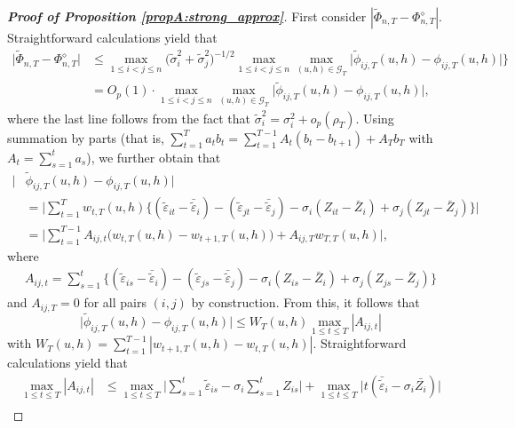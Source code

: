 \begin{proof}[\textnormal{\textbf{Proof of Proposition \ref{propA:strong_approx}}}]
First consider $|\widetilde{\Phi}_{n, T} - \Phi_{n, T}^{\diamond}|$. Straightforward calculations yield that 
\begin{align}
\big| \widetilde{\Phi}_{n, T} - \Phi_{n, T}^{\diamond} \big| 
 & \le \max_{1\le i < j \le n} \big(\widetilde{\sigma}_i^2 + \widetilde{\sigma}_j^2 \big)^{-1/2} \max_{1\le i < j \le n} \max_{(u,h) \in \mathcal{G}_T} \big| \widetilde{\phi}_{ij, T}(u,h) - \phi_{ij, T}(u,h) \big|\Big\}  \nonumber \\ 
 & = O_p(1) \cdot \max_{1\le i < j \le n} \max_{(u,h) \in \mathcal{G}_T} \big| \widetilde{\phi}_{ij, T}(u,h) - \phi_{ij, T}(u,h) \big|, \label{eqA:strong_approx:bound2}
\end{align}
where the last line follows from the fact that $\widetilde{\sigma}_i^2 = \sigma_i^2 + o_p(\rho_T)$. Using summation by parts (that is, $\sum_{t=1}^T a_t b_t = \sum_{t=1}^{T-1} A_t (b_t - b_{t+1}) + A_T b_T$ with $A_t = \sum_{s=1}^t a_s$), we further obtain that 
\begin{align*}
\big| & \widetilde{\phi}_{ij, T}(u,h) - \phi_{ij, T}(u,h) \big|  \\
 & =\bigg|\sum_{t=1}^T w_{t,T}(u,h) \big\{ (\widetilde{\varepsilon}_{it} - \bar{\widetilde{\varepsilon}}_i) - (\widetilde{\varepsilon}_{jt} - \bar{\widetilde{\varepsilon}}_j) -{\sigma}_i (Z_{it} - \bar{Z}_i) + {\sigma}_j (Z_{jt} - \bar{Z}_j) \big\}\bigg|  \\
 & =\Big|\sum_{t=1}^{T-1} A_{ij, t} \big(w_{t,T}(u,h) -w_{t+1,T}(u,h)\big) + A_{ij, T} w_{T,T}(u,h)\Big|,
\end{align*}
where 
\begin{align*}
A_{ij, t} = \sum_{s=1}^t \big\{ (\widetilde{\varepsilon}_{is} - \bar{\widetilde{\varepsilon}}_i)  - (\widetilde{\varepsilon}_{js} - \bar{\widetilde{\varepsilon}}_j) -{\sigma}_i (Z_{is} - \bar{Z}_i) + {\sigma}_j (Z_{js} - \bar{Z}_j) \big\}
\end{align*}
and $A_{ij, T} = 0$ for all pairs $(i, j)$ by construction. From this, it follows that 
\begin{equation}\label{eq-strongapprox-bound3}
\big| \widetilde{\phi}_{ij, T}(u,h) - \phi_{ij, T}(u,h) \big| \le W_T(u, h) \max_{1 \le t \le T} |A_{ij, t}|
\end{equation}
with $W_T(u,h) = \sum_{t=1}^{T-1} |w_{t+1,T}(u,h) - w_{t,T}(u,h)|$. Straightforward calculations yield that
\begin{align*}
\max_{1 \le t \le T} |A_{ij, t}| 
 & \le \max_{1 \le t \le T} \Big| \sum\limits_{s=1}^t \widetilde{\varepsilon}_{is} -{\sigma}_i \sum\limits_{s=1}^t Z_{is} \Big| + \max_{1 \le t \le T} \Big| t (\bar{\widetilde{\varepsilon}}_{i} - {\sigma}_i \bar{Z_i}) \Big|\\

\end{align*}
\end{proof}
